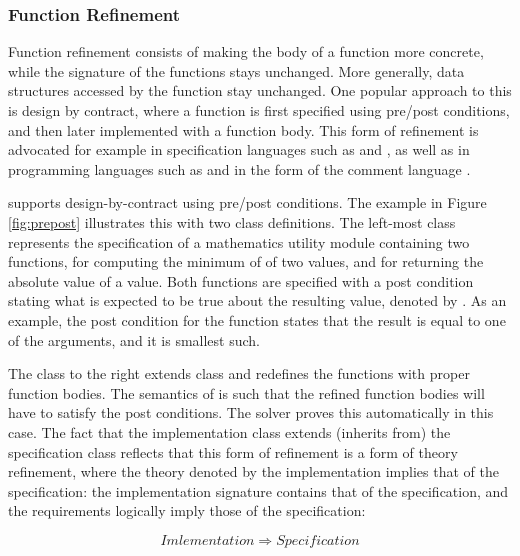 \subsubsection{Function Refinement}

Function refinement consists of making the body of a function more concrete,
while the signature of the functions stays unchanged. More generally, data 
structures accessed by the function stay unchanged. One popular approach to this
is design by contract, where a function is first specified using pre/post 
conditions, and then later implemented with a function body. This form of 
refinement is advocated for example in specification languages such as 
\vdm{} \cite{vdm} and \raiselang{} \cite{raise}, as well as in programming
languages such as \eiffel{} \cite{eiffel} and \java{} in the form of the \jml{}
comment language \cite{jml}. 

\Klang{} supports design-by-contract using pre/post conditions. The example in
Figure \ref{fig:prepost} illustrates this with two class definitions. The left-most
class  represents the specification of a mathematics utility 
module containing two functions,  for computing the minimum of of
two values, and  for returning the absolute value of a value. Both 
functions are specified with a post condition stating what is expected to be true
about the resulting value, denoted by . As an example, the post
condition for the  function states that the result is equal to one of
the arguments, and it is smallest such.

The class 
to the right extends class  and redefines the functions with
proper function bodies. The semantics of \Klang{} is such that the refined function 
bodies will have to satisfy the post conditions. The \Klang{} solver proves this
automatically in this case. The fact that the implementation class extends 
(inherits from) the specification class reflects that this form of refinement is a 
form of theory refinement, where the theory denoted by the implementation implies 
that of the specification: the implementation signature contains that of the 
specification, and the requirements logically imply those of the specification:

\[
Imlementation \Rightarrow Specification
\]


